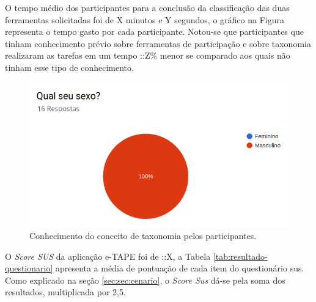 \par
O tempo médio dos participantes para a conclusão da classificação das duas ferramentas solicitadas foi de X minutos e Y segundos, o gráfico na Figura \label{fig:grafico-tempo}
representa o tempo gasto por cada participante. Notou-se que participantes que tinham conhecimento prévio sobre ferramentas de participação e sobre taxonomia realizaram 
as tarefas em um tempo ::Z\% menor se comparado aos quais não tinham esse tipo de conhecimento.

\begin{figure}[!ht]
    \centering
    \includegraphics[scale=0.3]{./figuras/grafico_placeholder.png}
    \caption{Conhecimento do conceito de taxonomia pelos participantes.}
    \label{fig:grafico-tempo}
\end{figure}

\par 
O \textit{Score SUS} da aplicação e-TAPE foi de ::X, a Tabela \ref{tab:resultado-questionario} apresenta a média de pontuação de cada item do questionário \acrshort{sus}.
Como explicado na seção \ref{sec:sec:cenario}, o \textit{Score Sus} dá-se pela soma dos resultados, multiplicada por 2,5.

